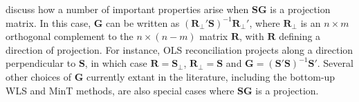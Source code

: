 \documentclass[12pt]{article}
\theoremstyle{definition}
\begin{document}
\cite{PanEtAl2019HF} discuss how a number of important properties arise when $\bm{S}\bm{G}$ is a projection matrix.  In this case, ${\bm G}$ can be written as $(\bm{R}_{\perp}'\bm{S})^{-1}\bm{R}_{\perp}'$, where $\bm{R}_{\perp}$ is an $n\times m$ orthogonal complement to the $n\times(n-m)$ matrix $\bm{R}$, with $\bm{R}$ defining a direction of projection.  For instance, OLS reconciliation \citep{HynEtAl2011} projects along a direction perpendicular to $\bm{S}$, in which case $\bm{R}=\bm{S}_{\perp}$, $\bm{R}_{\perp}=\bm{S}$ and $\bm{G}=(\bm{S}'\bm{S})^{-1}\bm{S}'$.  Several other choices of $\bm{G}$ currently extant in the literature, including the bottom-up \citep{Dunn1976} WLS and MinT \citep{WicEtAl2019} methods, are also special cases where $\bm{S}\bm{G}$ is a projection. %

\end{document}
